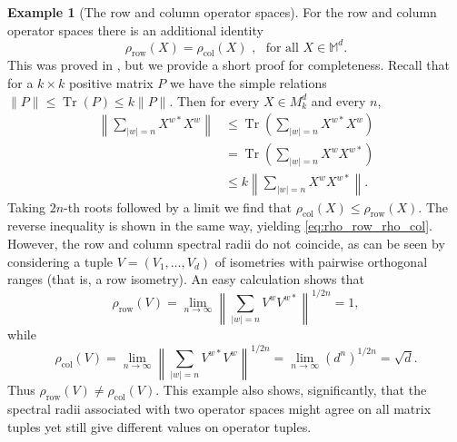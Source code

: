 \documentclass[12pt]{amsart}
\numberwithin{equation}{section}
\theoremstyle{definition}
\newtheorem{example}[theorem]{Example}
\newcommand{\be}{\begin{equation}}
\newcommand{\ee}{\end{equation}}
\newcommand{\bM}{\mathbb{M}}
\newcommand{\Tr}{\operatorname{Tr}}
\begin{document}
\begin{example}[The row and column operator spaces]
For the row and column operator spaces there is an additional identity 
\be\label{eq:rho_row_rho_col}
\rho_{\operatorname{row}}(X) = \rho_{\operatorname{col}}(X) \,\, , \,\, \textrm{ for all } X \in \bM^d. 
\ee
This was proved in \cite[Lemma 2.1]{JMS-clark}, but we provide a short proof for completeness. 
Recall that for a $k \times k$ positive matrix $P$ we have the simple relations $\|P\| \leq \Tr(P) \leq k \|P\|$. 
Then for every $X \in M_k^d$ and every $n$, 
    \begin{align*}
    \left\| \sum_{|w|=n} X^{w*} X^w \right\|
    & \leq \Tr\left( \sum_{|w|=n} X^{w*}X^w \right) \\
    &= \Tr\left( \sum_{|w|=n} X^wX^{w*} \right) \\
    & \leq k \left\|\sum_{|w|=n} X^wX^{w*} \right\|. 
    \end{align*}
    Taking $2n$-th roots followed by a limit we find that $\rho_{\operatorname{col}}(X) \leq \rho_{\operatorname{row}}(X)$. The reverse inequality is shown in the same way, yielding \eqref{eq:rho_row_rho_col}. 
    However, the row and column spectral radii do not coincide, as can be seen by considering a tuple $V = (V_1, \ldots, V_d)$ of isometries with pairwise orthogonal ranges (that is, a row isometry). 
    An easy calculation shows that
    \be\label{eq:VVstar}
    \rho_{\operatorname{row}}(V) = \lim_{n\to \infty} \left\| \sum_{|w|=n} V^w V^{w*} \right\|^{1/2n} = 1, 
    \ee
    while 
    \be\label{eq:VstarV}
    \rho_{\operatorname{col}}(V) = \lim_{n\to \infty} \left\| \sum_{|w|=n} V^{w*} V^{w} \right\|^{1/2n} = 
    \lim_{n\to \infty} (d^n)^{1/2n}= \sqrt{d}. 
    \ee
    Thus $\rho_{\operatorname{row}}(V) \neq \rho_{\operatorname{col}}(V)$. 
    This example also shows, significantly, that the spectral radii associated with two operator spaces might agree on all matrix tuples yet still give different values on operator tuples. 
\end{example}
\end{document}
